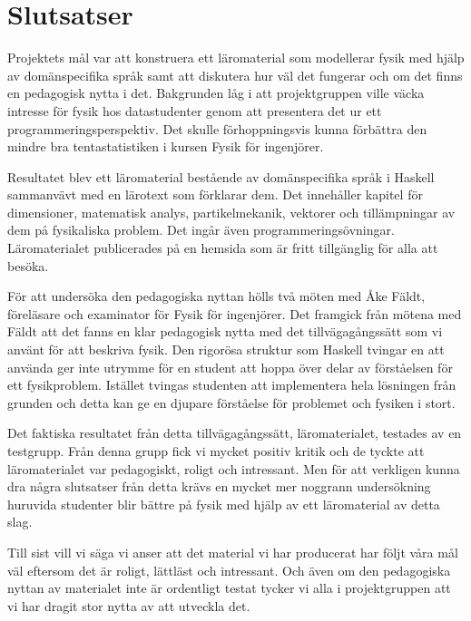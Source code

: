 
\chapter{Slutsatser}

Projektets mål var att konstruera ett läromaterial som modellerar fysik med
hjälp av domänspecifika språk samt att diskutera hur väl det fungerar och om det finns en
pedagogisk nytta i det. Bakgrunden låg i att projektgruppen ville väcka intresse
för fysik hos datastudenter genom att presentera det ur ett
programmeringsperspektiv. Det skulle förhoppningsvis kunna förbättra den mindre
bra tentastatistiken i kursen Fysik för ingenjörer.

Resultatet blev ett läromaterial bestående av domänspecifika språk i Haskell
sammanvävt med en lärotext som förklarar dem. Det innehåller kapitel för
dimensioner, matematisk analys, partikelmekanik, vektorer och tillämpningar av
dem på fysikaliska problem. Det ingår även programmeringsövningar.
Läromaterialet publicerades på en hemsida som är fritt tillgänglig för alla att
besöka.

För att undersöka den pedagogiska nyttan hölls två möten med Åke Fäldt, föreläsare och examinator för Fysik
för ingenjörer. Det framgick från mötena med Fäldt att det fanns en klar
pedagogisk nytta med det tillvägagångssätt som vi använt för att beskriva fysik.
Den rigorösa struktur som Haskell tvingar en att använda ger inte utrymme för en
student att hoppa över delar av förståelsen för ett fysikproblem. Istället
tvingas studenten att implementera hela lösningen från grunden och detta kan
ge en djupare förståelse för problemet och fysiken i stort.

Det faktiska resultatet från detta tillvägagångssätt, läromaterialet,
testades av en testgrupp. Från denna grupp fick vi mycket positiv kritik och de
tyckte att läromaterialet var pedagogiskt, roligt och intressant. Men för att
verkligen kunna dra några slutsatser från detta krävs en mycket mer noggrann
undersökning huruvida studenter blir bättre på fysik med hjälp av ett
läromaterial av detta slag.

Till sist vill vi säga vi anser att det material vi har producerat har följt
våra mål väl eftersom det är roligt, lättläst och intressant. Och även om den
pedagogiska nyttan av materialet inte är ordentligt testat tycker vi alla i
projektgruppen att vi har dragit stor nytta av att utveckla det.
